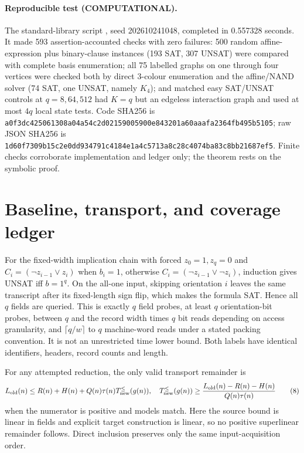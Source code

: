 \documentclass[11pt]{article}
\newcommand{\COMP}{\textbf{COMPUTATIONAL}}
\begin{document}
\paragraph{Reproducible test (\COMP).}
The standard-library script , seed
202610241048, completed in 0.557328 seconds.  It made 593
assertion-accounted checks with zero failures: 500 random affine-expression
plus binary-clause instances (193 SAT, 307 UNSAT) were compared with complete
basis enumeration; all 75 labelled graphs on one through four vertices were
checked both by direct 3-colour enumeration and the affine/NAND solver
(74 SAT, one UNSAT, namely $K_4$); and matched easy SAT/UNSAT controls at
$q=8,64,512$ had $K=q$ but an edgeless interaction graph and used at most
$4q$ local state tests.  Code SHA256 is
\texttt{a0f3dc425061308a04a54c2d02159005900e843201a60aaafa2364fb495b5105};
raw JSON SHA256 is
\texttt{1d60f7309b15c2e0dd934791c4184e1a4c5713a8c28c4074ba83c8bb21687ef5}.
Finite checks corroborate implementation and ledger only; the theorem rests
on the symbolic proof.

\section{Baseline, transport, and coverage ledger}
For the fixed-width implication chain with forced $z_0=1,z_q=0$ and
$C_i=(\neg z_{i-1}\vee z_i)$ when $b_i=1$, otherwise
$C_i=(\neg z_{i-1}\vee\neg z_i)$, induction gives UNSAT iff $b=1^q$.
On the all-one input, skipping orientation $i$ leaves the same transcript
after its fixed-length sign flip, which makes the formula SAT.  Hence all
$q$ fields are queried.  This is exactly $q$ field probes, at least $q$
orientation-bit probes, between $q$ and the record width times $q$ bit reads
depending on access granularity, and $\lceil q/w\rceil$ to $q$ machine-word
reads under a stated packing convention.  It is not an unrestricted time
lower bound.  Both labels have identical identifiers, headers, record counts
and length.

For any attempted reduction, the only valid transport remainder is
\[
L_{\rm old}(n)\le R(n)+H(n)+Q(n)\tau(n)T_{\rm new}^{\le}(g(n)),
\quad
T_{\rm new}^{\le}(g(n))\ge
\frac{L_{\rm old}(n)-R(n)-H(n)}{Q(n)\tau(n)}                         \tag{8}
\]
when the numerator is positive and models match.  Here the source bound is
linear in fields and explicit target construction is linear, so no positive
superlinear remainder follows.  Direct inclusion preserves only the same
input-acquisition order.
\end{document}
